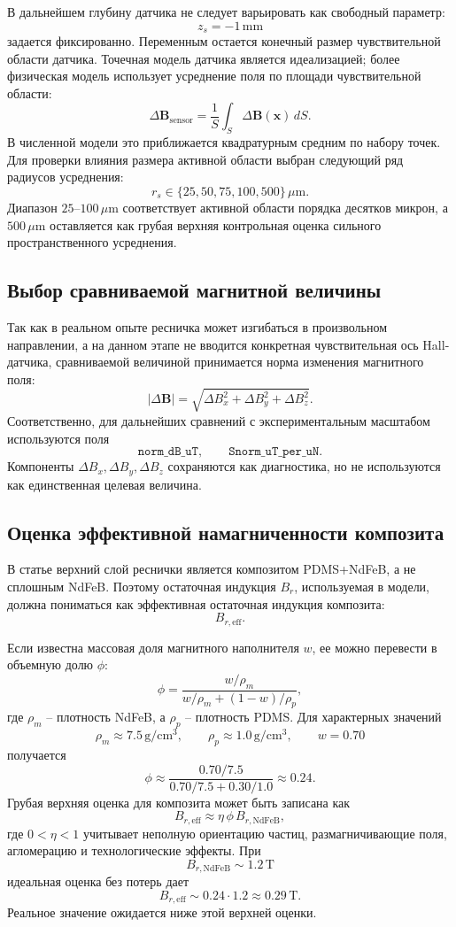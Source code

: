 \documentclass[12pt,a4paper]{article}
\begin{document}
В дальнейшем глубину датчика не следует варьировать как свободный параметр:
\[
    z_s=-1\,\mathrm{mm}
\]
задается фиксированно. Переменным остается конечный размер чувствительной
области датчика. Точечная модель датчика является идеализацией; более
физическая модель использует усреднение поля по площади чувствительной
области:
\[
    \Delta\mathbf B_{\mathrm{sensor}}
    =
    \frac{1}{S}
    \int_S
    \Delta\mathbf B(\mathbf x)\,dS.
\]
В численной модели это приближается квадратурным средним по набору точек.
Для проверки влияния размера активной области выбран следующий ряд радиусов
усреднения:
\[
    r_s\in\{25,50,75,100,500\}\,\mu\mathrm{m}.
\]
Диапазон \(25\)--\(100\,\mu\mathrm{m}\) соответствует активной области порядка
десятков микрон, а \(500\,\mu\mathrm{m}\) оставляется как грубая верхняя
контрольная оценка сильного пространственного усреднения.

\subsection*{Выбор сравниваемой магнитной величины}

Так как в реальном опыте ресничка может изгибаться в произвольном направлении,
а на данном этапе не вводится конкретная чувствительная ось Hall-датчика,
сравниваемой величиной принимается норма изменения магнитного поля:
\[
    |\Delta\mathbf B|
    =
    \sqrt{
        \Delta B_x^2+
        \Delta B_y^2+
        \Delta B_z^2
    }.
\]
Соответственно, для дальнейших сравнений с экспериментальным масштабом
используются поля
\[
    \texttt{norm\_dB\_uT},
    \qquad
    \texttt{Snorm\_uT\_per\_uN}.
\]
Компоненты \(\Delta B_x,\Delta B_y,\Delta B_z\) сохраняются как диагностика,
но не используются как единственная целевая величина.

\subsection*{Оценка эффективной намагниченности композита}

В статье верхний слой реснички является композитом PDMS+NdFeB, а не сплошным
NdFeB. Поэтому остаточная индукция \(B_r\), используемая в модели, должна
пониматься как эффективная остаточная индукция композита:
\[
    B_{r,\mathrm{eff}}.
\]

Если известна массовая доля магнитного наполнителя \(w\), ее можно перевести в
объемную долю \(\phi\):
\[
    \phi
    =
    \frac{w/\rho_m}
    {w/\rho_m+(1-w)/\rho_p},
\]
где \(\rho_m\) -- плотность NdFeB, а \(\rho_p\) -- плотность PDMS. Для
характерных значений
\[
    \rho_m\approx 7.5\,\mathrm{g/cm^3},
    \qquad
    \rho_p\approx 1.0\,\mathrm{g/cm^3},
    \qquad
    w=0.70
\]
получается
\[
    \phi
    \approx
    \frac{0.70/7.5}{0.70/7.5+0.30/1.0}
    \approx 0.24.
\]
Грубая верхняя оценка для композита может быть записана как
\[
    B_{r,\mathrm{eff}}
    \approx
    \eta\,\phi\,B_{r,\mathrm{NdFeB}},
\]
где \(0<\eta<1\) учитывает неполную ориентацию частиц, размагничивающие поля,
агломерацию и технологические эффекты. При
\[
    B_{r,\mathrm{NdFeB}}\sim 1.2\,\mathrm{T}
\]
идеальная оценка без потерь дает
\[
    B_{r,\mathrm{eff}}\sim 0.24\cdot 1.2
    \approx 0.29\,\mathrm{T}.
\]
Реальное значение ожидается ниже этой верхней оценки.
\end{document}
